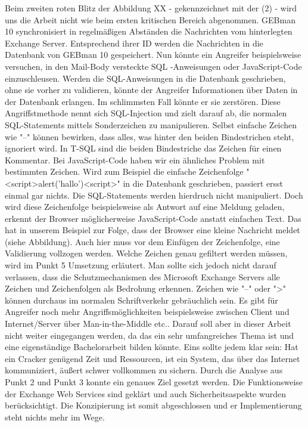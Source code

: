 \noindent
Beim zweiten roten Blitz der Abbildung XX - gekennzeichnet mit der (2) - wird uns die Arbeit nicht wie beim ersten kritischen Bereich abgenommen. GEBman 10 synchronisiert in regelmäßigen Abständen die Nachrichten vom hinterlegten Exchange Server. Entsprechend ihrer ID werden die Nachrichten in die Datenbank von GEBman 10 gespeichert. Nun könnte ein Angreifer beispielsweise versuchen, in den Mail-Body versteckte SQL -Anweisungen oder JavaScript-Code einzuschleusen. Werden die SQL-Anweisungen in die Datenbank geschrieben, ohne sie vorher zu validieren, könnte der Angreifer Informationen über Daten in der Datenbank erlangen. Im schlimmsten Fall könnte er sie zerstören. Diese Angriffstmethode nennt sich SQL-Injection und zielt darauf ab, die normalen SQL-Statements mittels Sonderzeichen zu manipulieren. Selbst einfache Zeichen wie "--" können bewirken, dass alles, was hinter den beiden Bindestrichen steht, ignoriert wird. In T-SQL sind die beiden Bindestriche das Zeichen für einen Kommentar.
\noindent
Bei JavaScript-Code haben wir ein ähnliches Problem mit bestimmten Zeichen. Wird zum Beispiel die einfache Zeichenfolge "<script>alert('hallo')<script>" in die Datenbank geschrieben, passiert ersst einmal gar nichts. Die SQL-Statements werden hierdruch nicht manipuliert. Doch wird diese Zeichenfolge beispielsweise als Antwort auf eine Meldung geladen, erkennt der Browser möglicherweise JavaScript-Code anstatt einfachen Text. Das hat in unserem Beispiel zur Folge, dass der Browser eine kleine Nachricht meldet (siehe Abbildung).
Auch hier muss vor dem Einfügen der Zeichenfolge, eine Validierung vollzogen werden. Welche Zeichen genau gefiltert werden müssen, wird im Punkt 5 Umsetzung erläutert. Man sollte sich jedoch nicht darauf verlassen, dass die Schutzmechanismen des Microsoft Exchange Servers alle Zeichen und Zeichenfolgen als Bedrohung erkennen. Zeichen wie "--" oder ">" können durchaus im normalen Schriftverkehr gebräuchlich sein.
\noindent
Es gibt für Angreifer noch mehr Angriffsmöglichkeiten beispielsweise zwischen Client und Internet/Server über Man-in-the-Middle etc.. Darauf soll aber in dieser Arbeit nicht weiter eingegangen werden, da das ein sehr umfangreiches Thema ist und eine eigenständige Bachelorarbeit bilden könnte. Eins sollte jedem klar sein: Hat ein Cracker genügend Zeit und Ressourcen, ist ein System, das über das Internet kommuniziert, äußert schwer vollkommen zu sichern. 
\noindent
Durch die Analyse aus Punkt 2 und Punkt 3 konnte ein genaues Ziel gesetzt werden. Die Funktionsweise der Exchange Web Services sind geklärt und auch Sicherheitsaspekte wurden berücksichtigt. Die Konzipierung ist somit abgeschlossen und er Implementierung steht nichts mehr im Wege.
